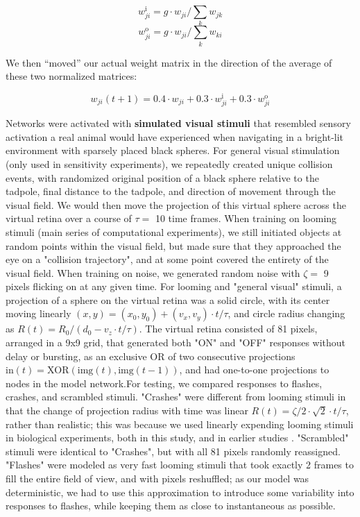 \documentclass{article}
\begin{document}
\[ w_{ji}^\text{i} = g \cdot w_{ji}/\sum_k{w_{jk}} \]
\[ w_{ji}^\text{o} = g \cdot w_{ji}/\sum_k{w_{ki}} \]

We then “moved” our actual weight matrix in the direction of the average of these two normalized matrices:

\[ w_{ji}(t+1) = 0.4 \cdot w_{ji} + 0.3 \cdot w^\text{i}_{ji} + 0.3 \cdot w^\text{o}_{ji} \]

Networks were activated with \textbf{simulated visual stimuli} that resembled sensory activation a real animal would have experienced when navigating in a bright-lit environment with sparsely placed black spheres. For general visual stimulation (only used in sensitivity experiments), we repeatedly created unique collision events, with randomized original position of a black sphere relative to the tadpole, final distance to the tadpole, and direction of movement through the visual field. We would then move the projection of this virtual sphere across the virtual retina over a course of $\tau=$ 10 time frames.  When training on looming stimuli (main series of computational experiments), we still initiated objects at random points within the visual field, but made sure that they approached the eye on a "collision trajectory", and at some point covered the entirety of the visual field. When training on noise, we generated random noise with $\zeta=$ 9 pixels flicking on at any given time. For looming and "general visual" stimuli, a projection of a sphere on the virtual retina was a solid circle, with its center moving linearly $(x,y) = (x_0,y_0)+(v_x,v_y)\cdot t/\tau$, and circle radius changing as $R(t) = R_0/(d_0 - v_z \cdot t/\tau)$. The virtual retina consisted of 81 pixels, arranged in a 9x9 grid, that generated both "ON" and "OFF" responses without delay or bursting, as an exclusive OR of two consecutive projections $\text{in}(t) = \text{XOR}(\text{img}(t),\text{img}(t-1))$, and had one-to-one projections to nodes in the model network.For testing, we compared responses to flashes, crashes, and scrambled stimuli. "Crashes" were different from looming stimuli in that the change of projection radius with time was linear $R(t) = \zeta/2 \cdot \sqrt{2} \cdot t/\tau$, rather than realistic; this was because we used linearly expending looming stimuli in biological experiments, both in this study, and in earlier studies \citep{khakhalin2014}. "Scrambled" stimuli were identical to "Crashes", but with all 81 pixels randomly reassigned. "Flashes" were modeled as very fast looming stimuli that took exactly 2 frames to fill the entire field of view, and with pixels reshuffled; as our model was deterministic, we had to use this approximation to introduce some variability into responses to flashes, while keeping them as close to instantaneous as possible.
\end{document}
